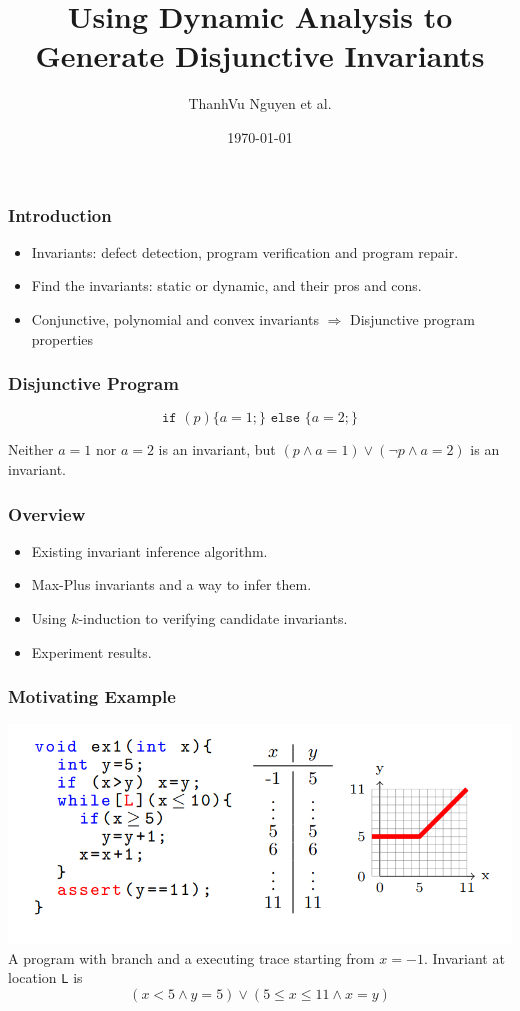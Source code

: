 \documentclass[11pt]{beamer}
\title{Using Dynamic Analysis to Generate Disjunctive Invariants}
\author{ThanhVu Nguyen et al.}
\date{\today}
\begin{document}
\maketitle
\begin{frame}\frametitle{Introduction}
\begin{itemize}
\item Invariants: defect detection, program verification and program repair.

\item Find the invariants: static or dynamic, and their pros and cons.

\item Conjunctive, polynomial and convex invariants $\Rightarrow$ Disjunctive program properties

\end{itemize}

\end{frame}
\begin{frame}\frametitle{Disjunctive Program}
\begin{example}
\[\texttt{if }(p)\{a = 1;\}\texttt{ else }\{a=2;\}\]
\end{example}
Neither $a = 1$ nor $a = 2$ is an invariant, but $(p \wedge a = 1)\vee (\neg p \wedge a = 2)$ is an invariant.
\end{frame}
\begin{frame}\frametitle{Overview}
\begin{itemize}
\item Existing invariant inference algorithm.


\item Max-Plus invariants and a way to infer them.


\item Using $k$-induction to verifying candidate invariants.


\item Experiment results.

\end{itemize}
\end{frame}

\begin{frame}\frametitle{Motivating Example}
\begin{example}[1]
\begin{center}
\includegraphics[scale=0.36]{1.png}
A program with branch and a executing trace starting from $x = -1$.
Invariant at location \texttt{L} is 
\[(x < 5 \wedge y = 5) \vee (5 \le x \le 11 \wedge x = y)\]
\end{center}
\end{example}

\end{frame}
\end{document}
